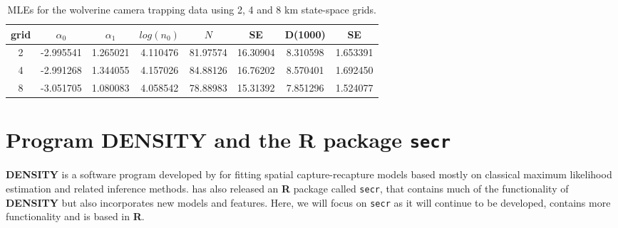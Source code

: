 \begin{table}
\centering
\caption{MLEs for the wolverine camera trapping data using 2, 4 and 8 km state-space grids.}
\begin{tabular}{cccccccc}
\hline \hline
grid &  $\alpha_0$  &  $\alpha_1$ &   $log(n_0)$  & $N$   &  SE & D(1000) &  SE \\ \hline
2  &  -2.995541& 1.265021 &4.110476 &81.97574& 16.30904 &8.310598 &1.653391\\
4  &  -2.991268&1.344055  &4.157026 &84.88126& 16.76202 &8.570401& 1.692450\\
8   & -3.051705& 1.080083 &4.058542 &78.88983& 15.31392 &7.851296& 1.524077\\
\end{tabular}
\label{mle.tab.wolv}
\end{table}


\begin{comment}
\subsection{
Exercises
}

{\flushleft
1.	Compute the 95\% confidence interval for wolverine density,
somehow. Comment on the practical implication of this level of precision.
}

{\flushleft
2.	Compute the AIC of this model and modify \mbox{\tt intlik3}
 to consider alternative link functions (at least one additional) and
 compare the  AIC of the different models and the estimates. Comment. 
}
\end{comment}


\section{Program DENSITY and the R package \mbox{\tt secr} }
\label{mle.sec.secr}

{\bf DENSITY} is a software program developed by \citet{efford:2004}
for fitting spatial capture-recapture models based mostly on classical
maximum likelihood estimation and related inference methods.
\citet{efford:2011} has also released an {\bf R} package called
\mbox{\tt secr}, that contains much of the functionality of {\bf
  DENSITY} but also incorporates new models and features.  Here, we
will focus on \mbox{\tt secr} as it will continue to be developed,
contains more functionality and is based in {\bf R}.

